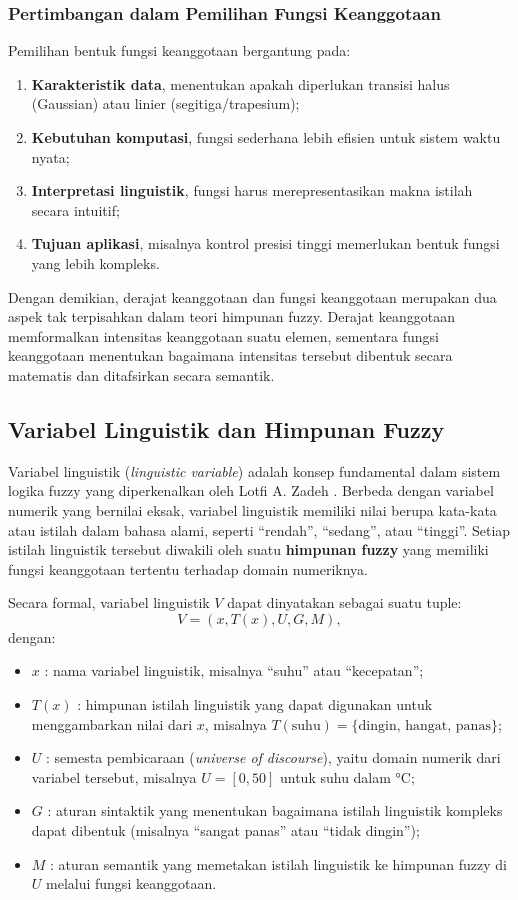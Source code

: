 \documentclass[12pt,a4paper]{article}
\theoremstyle{remark}
\begin{document}
\subsubsection{Pertimbangan dalam Pemilihan Fungsi Keanggotaan}

Pemilihan bentuk fungsi keanggotaan bergantung pada:
\begin{enumerate}
    \item \textbf{Karakteristik data}, menentukan apakah diperlukan transisi halus (Gaussian) atau linier (segitiga/trapesium);
    \item \textbf{Kebutuhan komputasi}, fungsi sederhana lebih efisien untuk sistem waktu nyata;
    \item \textbf{Interpretasi linguistik}, fungsi harus merepresentasikan makna istilah secara intuitif;
    \item \textbf{Tujuan aplikasi}, misalnya kontrol presisi tinggi memerlukan bentuk fungsi yang lebih kompleks.
\end{enumerate}

Dengan demikian, derajat keanggotaan dan fungsi keanggotaan merupakan dua aspek tak terpisahkan dalam teori himpunan fuzzy. Derajat keanggotaan memformalkan intensitas keanggotaan suatu elemen, sementara fungsi keanggotaan menentukan bagaimana intensitas tersebut dibentuk secara matematis dan ditafsirkan secara semantik.

\subsection{Variabel Linguistik dan Himpunan Fuzzy}
Variabel linguistik (\textit{linguistic variable}) adalah konsep fundamental dalam sistem logika fuzzy yang diperkenalkan oleh Lotfi A. Zadeh \cite{zadeh_concept_1975}. Berbeda dengan variabel numerik yang bernilai eksak, variabel linguistik memiliki nilai berupa kata-kata atau istilah dalam bahasa alami, seperti “rendah”, “sedang”, atau “tinggi”. Setiap istilah linguistik tersebut diwakili oleh suatu \textbf{himpunan fuzzy} yang memiliki fungsi keanggotaan tertentu terhadap domain numeriknya.

Secara formal, variabel linguistik \(V\) dapat dinyatakan sebagai suatu tuple:
\[
    V = (x, T(x), U, G, M),
\]
dengan:
\begin{itemize}
    \item \(x\) : nama variabel linguistik, misalnya “suhu” atau “kecepatan”;
    \item \(T(x)\) : himpunan istilah linguistik yang dapat digunakan untuk menggambarkan nilai dari \(x\), misalnya \(T(\text{suhu}) = \{\text{dingin, hangat, panas}\}\);
    \item \(U\) : semesta pembicaraan (\textit{universe of discourse}), yaitu domain numerik dari variabel tersebut, misalnya \(U = [0, 50]\) untuk suhu dalam °C;
    \item \(G\) : aturan sintaktik yang menentukan bagaimana istilah linguistik kompleks dapat dibentuk (misalnya “sangat panas” atau “tidak dingin”);
    \item \(M\) : aturan semantik yang memetakan istilah linguistik ke himpunan fuzzy di \(U\) melalui fungsi keanggotaan.
\end{itemize}
\end{document}
